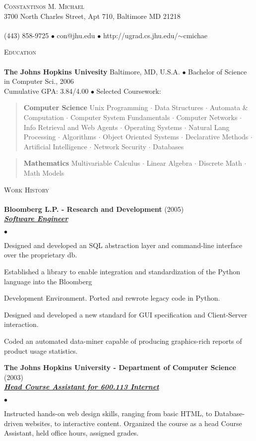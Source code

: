 \documentclass{article}
\newcommand{\area}[2]{\vspace*{-9pt} \begin{verse}\textbf{#1}   #2 \end{verse}  }
\newcommand{\lineunder}{\vspace*{-8pt} \\ \hspace*{-18pt} \hrulefill \\}
\newcommand{\header}[1]{{\hspace*{-15pt}\vspace*{6pt} \textsc{#1}} \vspace*{-6pt} \lineunder}
\newcommand{\employer}[3]{{ \textbf{#1} (#2)\\ \underline{\textbf{\emph{#3}}}\\  }}
\newcommand{\contact}[3]{
\vspace*{-8pt}
\begin{center}
{\LARGE \scshape {#1}}\\
#2 \lineunder 
#3
\end{center}
\vspace*{-8pt}
}
\newenvironment{achievements}{\begin{list}{$\bullet$}{\topsep 0pt \itemsep -2pt}}{\vspace*{4pt}\end{list}}
\newcommand{\schoolwithcourses}[4]{
 \textbf{#1} #2 $\bullet$ #3\\ 
#4 $\bullet$  Selected Coursework:\\
\vspace*{5pt}
}
\begin{document}
\small
\smallskip
\vspace*{-44pt}

\contact{Constantinos M. Michael}
{3700 North Charles Street, Apt 710, Baltimore MD 21218}
{(443) 858-9725 $\bullet$ con@jhu.edu  $\bullet$ http://ugrad.cs.jhu.edu/$\sim$cmichae}

\header{Education}

\schoolwithcourses{The Johns Hopkins Univesity}{Baltimore, MD, U.S.A.}{Bachelor of Science in Computer Sci., 2006}
{Cumulative GPA: 3.84/4.00}
	\area{Computer Science}{ Unix Programming $\cdot$ Data Structures $\cdot$ Automata \& Computation $\cdot$ Computer System
Fundamentals $\cdot$ Computer Networks $\cdot$ Info Retrieval and Web Agents $\cdot$ Operating Systems $\cdot$
Natural Lang Processing $\cdot$ Algorithms $\cdot$ Object Oriented Systems $\cdot$ Declarative Methods $\cdot$
Artificial Intelligence $\cdot$ Network Security $\cdot$ Databases}
	\area{Mathematics}{Multivariable Calculus $\cdot$ Linear Algebra $\cdot$ Discrete Math $\cdot$ Math Models}

\header{Work History}
\employer{Bloomberg L.P. - Research and Development}{2005}{Software Engineer}
	\begin{achievements}
	\item Designed and developed an SQL abstraction layer and command-line interface over the proprietary db.
	\item Established a library to enable integration and standardization of the Python language into the Bloomberg
	\item Development Environment. Ported and rewrote legacy code in Python.
	\item Designed and developed a new standard for GUI specification and Client-Server interaction.
	\item Coded an automated data-miner capable of producing graphics-rich reports of product usage statistics.
	\end{achievements}

\employer{The Johns Hopkins University - Department of Computer Science}{2003}{Head Course Assistant for 600.113 Internet}
	\begin{achievements}
	\item Instructed hands-on web design skills, ranging from basic HTML, to Database-driven websites, to interactive content. Organized the course as a head Course Assistant, held office hours, assigned grades.
	\end{achievements}
\end{document}
